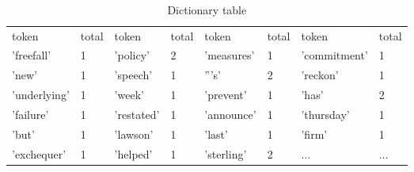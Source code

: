 \begin {table}[h!]
\caption {Dictionary table} \label{tab:title} 
\begin{center}
    \scriptsize\tt
    \begin{tabular}{ | l | l || l | l || l | l || l | l | }
    \hline
    token     & total & token   & total & token     & total & token       & total\\
    'freefall'& 1     & 'policy'& 2     & 'measures'&1      & 'commitment'&1\\
    'new'&1& 'speech'&1& '''s'&2& 'reckon'&1\\
    'underlying'&1&'week'&1& 'prevent'&1& 'has'&2\\
    'failure'&1& 'restated'&1&'announce'&1& 'thursday'&1\\
    'but'&1& 'lawson'&1& 'last'&1& 'firm'&1\\
    'exchequer'&1& 'helped'&1& 'sterling'&2& $\ldots$ & $\ldots$\\ 
    \hline
    \end{tabular}
\end{center}
\end {table}


